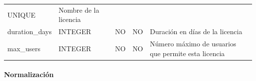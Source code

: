 \documentclass[12pt,a4paperpaper,]{report}
\let\oldparagraph\paragraph
\renewcommand{\paragraph}[1]{\oldparagraph{#1}\mbox{}}
\begin{document}
\begin{longtable}[]{@{}lllll@{}}
\begin{minipage}[t]{0.19\columnwidth}
UNIQUE\strut
\end{minipage} & \begin{minipage}[t]{0.11\columnwidth}\raggedright\strut
Nombre de la licencia\strut
\end{minipage}\tabularnewline
\begin{minipage}[t]{0.21\columnwidth}\raggedright\strut
duration\_days\strut
\end{minipage} & \begin{minipage}[t]{0.19\columnwidth}\raggedright\strut
INTEGER\strut
\end{minipage} & \begin{minipage}[t]{0.16\columnwidth}\raggedright\strut
NO\strut
\end{minipage} & \begin{minipage}[t]{0.19\columnwidth}\raggedright\strut
NO\strut
\end{minipage} & \begin{minipage}[t]{0.11\columnwidth}\raggedright\strut
Duración en días de la licencia\strut
\end{minipage}\tabularnewline
\begin{minipage}[t]{0.21\columnwidth}\raggedright\strut
max\_users\strut
\end{minipage} & \begin{minipage}[t]{0.19\columnwidth}\raggedright\strut
INTEGER\strut
\end{minipage} & \begin{minipage}[t]{0.16\columnwidth}\raggedright\strut
NO\strut
\end{minipage} & \begin{minipage}[t]{0.19\columnwidth}\raggedright\strut
NO\strut
\end{minipage} & \begin{minipage}[t]{0.11\columnwidth}\raggedright\strut
Número máximo de usuarios que permite esta licencia\strut
\end{minipage}\tabularnewline
\bottomrule
\end{longtable}

\paragraph{Normalización}\label{normalizaciuxf3n-7}
\end{document}
